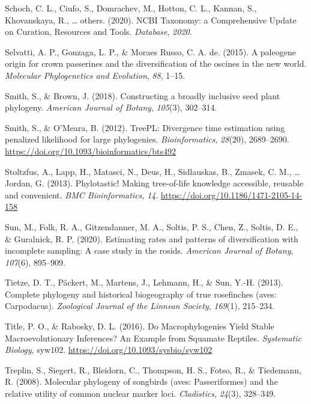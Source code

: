 \documentclass[english,man]{apa6}
\begin{document}
\leavevmode\hypertarget{ref-schoch2020ncbi}{}%
Schoch, C. L., Ciufo, S., Domrachev, M., Hotton, C. L., Kannan, S., Khovanskaya, R., \ldots{} others. (2020). NCBI Taxonomy: a Comprehensive Update on Curation, Resources and Tools. \emph{Database}, \emph{2020}.

\leavevmode\hypertarget{ref-selvatti2015paleogene}{}%
Selvatti, A. P., Gonzaga, L. P., \& Moraes Russo, C. A. de. (2015). A paleogene origin for crown passerines and the diversification of the oscines in the new world. \emph{Molecular Phylogenetics and Evolution}, \emph{88}, 1--15.

\leavevmode\hypertarget{ref-smith2018constructing}{}%
Smith, S., \& Brown, J. (2018). Constructing a broadly inclusive seed plant phylogeny. \emph{American Journal of Botany}, \emph{105}(3), 302--314.

\leavevmode\hypertarget{ref-Smith2012}{}%
Smith, S., \& O'Meara, B. (2012). TreePL: Divergence time estimation using penalized likelihood for large phylogenies. \emph{Bioinformatics}, \emph{28}(20), 2689--2690. \url{https://doi.org/10.1093/bioinformatics/bts492}

\leavevmode\hypertarget{ref-Stoltzfus2013}{}%
Stoltzfus, A., Lapp, H., Matasci, N., Deus, H., Sidlauskas, B., Zmasek, C. M., \ldots{} Jordan, G. (2013). Phylotastic! Making tree-of-life knowledge accessible, reusable and convenient. \emph{BMC Bioinformatics}, \emph{14}. \url{https://doi.org/10.1186/1471-2105-14-158}

\leavevmode\hypertarget{ref-sun2020estimating}{}%
Sun, M., Folk, R. A., Gitzendanner, M. A., Soltis, P. S., Chen, Z., Soltis, D. E., \& Guralnick, R. P. (2020). Estimating rates and patterns of diversification with incomplete sampling: A case study in the rosids. \emph{American Journal of Botany}, \emph{107}(6), 895--909.

\leavevmode\hypertarget{ref-tietze2013complete}{}%
Tietze, D. T., Päckert, M., Martens, J., Lehmann, H., \& Sun, Y.-H. (2013). Complete phylogeny and historical biogeography of true rosefinches (aves: Carpodacus). \emph{Zoological Journal of the Linnean Society}, \emph{169}(1), 215--234.

\leavevmode\hypertarget{ref-title2016macrophylogenies}{}%
Title, P. O., \& Rabosky, D. L. (2016). Do Macrophylogenies Yield Stable Macroevolutionary Inferences? An Example from Squamate Reptiles. \emph{Systematic Biology}, syw102. \url{https://doi.org/10.1093/sysbio/syw102}

\leavevmode\hypertarget{ref-treplin2008molecular}{}%
Treplin, S., Siegert, R., Bleidorn, C., Thompson, H. S., Fotso, R., \& Tiedemann, R. (2008). Molecular phylogeny of songbirds (aves: Passeriformes) and the relative utility of common nuclear marker loci. \emph{Cladistics}, \emph{24}(3), 328--349.
\end{document}
